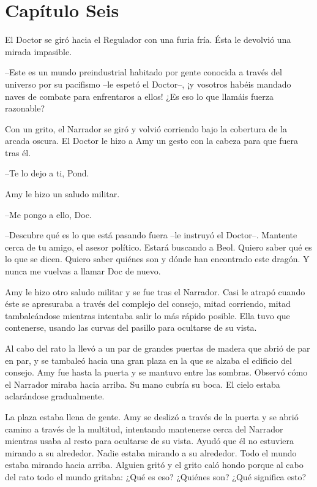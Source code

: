 \chapter*{Capítulo Seis}

{El Doctor se giró hacia el Regulador con una furia fría. Ésta le
devolvió una mirada impasible.}

{--Este es un mundo preindustrial habitado por gente conocida a través
	del universo por su pacifismo --le espetó el Doctor--, ¡y vosotros
	habéis mandado naves de combate para enfrentaros a ellos! ¿Es eso lo que
llamáis fuerza razonable?}

{Con un grito, el Narrador se giró y volvió corriendo bajo la cobertura
	de la arcada oscura. El Doctor le hizo a Amy un gesto con la cabeza para
que fuera tras él.}

{--Te lo dejo a ti, Pond.}

{Amy le hizo un saludo militar.}

{--Me pongo a ello, Doc.}

{--Descubre qué es lo que está pasando fuera --le instruyó el
	Doctor--. Mantente cerca de tu amigo, el asesor político. Estará
	buscando a Beol. Quiero saber qué es lo que se dicen. Quiero saber
	quiénes son y dónde han encontrado este dragón. Y nunca me vuelvas a
llamar Doc de nuevo.}

{Amy le hizo otro saludo militar y se fue tras el Narrador. Casi le
	atrapó cuando éste se apresuraba a través del complejo del consejo,
	mitad corriendo, mitad tambaleándose mientras intentaba salir lo más
	rápido posible. Ella tuvo que contenerse, usando las curvas del pasillo
para ocultarse de su vista.}

{Al cabo del rato la llevó a un par de grandes puertas de madera que
	abrió de par en par, y se tambaleó hacia una gran plaza en la que se
	alzaba el edificio del consejo. Amy fue hasta la puerta y se mantuvo
	entre las sombras. Observó cómo el Narrador miraba hacia arriba. Su mano
cubría su boca. El cielo estaba aclarándose gradualmente.}

{La plaza estaba llena de gente. Amy se deslizó a través de la puerta y
	se abrió camino a través de la multitud, intentando mantenerse cerca del
	Narrador mientras usaba al resto para ocultarse de su vista. Ayudó que
	él no estuviera mirando a su alrededor. Nadie estaba mirando a su
	alrededor. Todo el mundo estaba mirando hacia arriba. Alguien gritó y el
	grito caló hondo porque al cabo del rato todo el mundo gritaba: ¿Qué es
eso? ¿Quiénes son? ¿Qué significa esto?}

